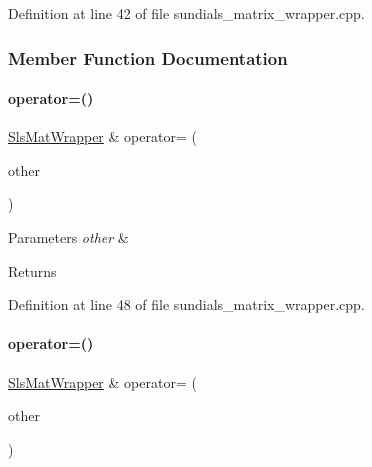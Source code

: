 Definition at line 42 of file sundials\+\_\+matrix\+\_\+wrapper.\+cpp.



\subsubsection{Member Function Documentation}
\mbox{\label{classamici_1_1_sls_mat_wrapper_a72d164abd031c6f8a0c675dc9b1e162d}} 
\paragraph{\texorpdfstring{operator=()}{operator=()}\hspace{0.1cm}{\footnotesize\ttfamily [1/2]}}
{\footnotesize\ttfamily \mbox{\hyperlink{classamici_1_1_sls_mat_wrapper}{Sls\+Mat\+Wrapper}} \& operator= (\begin{DoxyParamCaption}\item[{const \mbox{\hyperlink{classamici_1_1_sls_mat_wrapper}{Sls\+Mat\+Wrapper}} \&}]{other }\end{DoxyParamCaption})}


\begin{DoxyParams}{Parameters}
{\em other} & \\
\hline
\end{DoxyParams}
\begin{DoxyReturn}{Returns}

\end{DoxyReturn}


Definition at line 48 of file sundials\+\_\+matrix\+\_\+wrapper.\+cpp.

\mbox{\label{classamici_1_1_sls_mat_wrapper_a6c2b446ec62b8131d8de000e691391a7}} 
\paragraph{\texorpdfstring{operator=()}{operator=()}\hspace{0.1cm}{\footnotesize\ttfamily [2/2]}}
{\footnotesize\ttfamily \mbox{\hyperlink{classamici_1_1_sls_mat_wrapper}{Sls\+Mat\+Wrapper}} \& operator= (\begin{DoxyParamCaption}\item[{\mbox{\hyperlink{classamici_1_1_sls_mat_wrapper}{Sls\+Mat\+Wrapper}} \&\&}]{other }\end{DoxyParamCaption})\hspace{0.3cm}{\ttfamily [noexcept]}}


